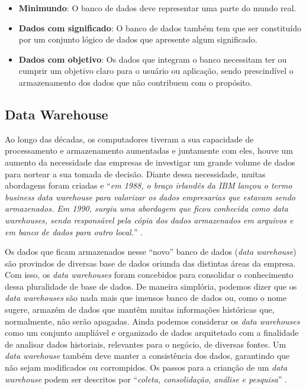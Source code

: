 \begin{itemize}
  \item \textbf{Minimundo}: O banco de dados deve representar uma parte do mundo real.
  \item \textbf{Dados com significado}: O banco de dados também tem que ser constituído por um conjunto lógico de dados que apresente algum significado.
  \item \textbf{Dados com objetivo}: Os dados que integram o banco necessitam ter ou cumprir um objetivo claro para o usuário ou aplicação, sendo prescindível o armazenamento dos dados que não contribuem com o propósito. \cite{vida2021datawarehouse}
\end{itemize} 


\subsection{Data Warehouse}
\label{subsec:datawarehouse}

Ao longo das décadas, os computadores tiveram a sua capacidade de processamento e armazenamento aumentadas e juntamente com eles, houve um aumento da necessidade das empresas de investigar um grande volume de dados para nortear a sua tomada de decisão. Diante dessa necessidade, muitas abordagens foram criadas e \enquote{\textit{em 1988, o braço irlandês da IBM lançou o termo business data warehouse para valorizar os dados empresarias que estavam sendo armazenados. Em 1990, surgiu uma abordagem que ficou conhecida como data warehouses, sendo responsável pela cópia dos dados armazenados em arquivos e em banco de dados para outro local.}} \cite{vida2021datawarehouse}.

Os dados que ficam armazenados nesse \enquote{novo} banco de dados (\textit{data warehouse}) são provindos de diversas base de dados oriunda das distintas áreas da empresa. Com isso, os \textit{data warehouses} foram concebidos para consolidar o conhecimento dessa pluralidade de base de dados. De maneira simplória, podemos dizer que os \textit{data warehouses} são nada mais que imensos banco de dados ou, como o nome sugere, armazém de dados que mantêm muitas informações históricas que, normalmente, não serão apagadas. Ainda podemos considerar os \textit{data warehouses} como um conjunto ampliável e organizado de dados arquitetado com a finalidade de analisar dados historiais, relevantes para o negócio, de diversas fontes. Um \textit{data warehouse} também deve manter a consistência dos dados, garantindo que não sejam modificados ou corrompidos. Os passos para a crianção de um \textit{data warehouse} podem ser descritos por \enquote{\textit{coleta, consolidação, análise e pesquisa}} \cite{vida2021datawarehouse}.

